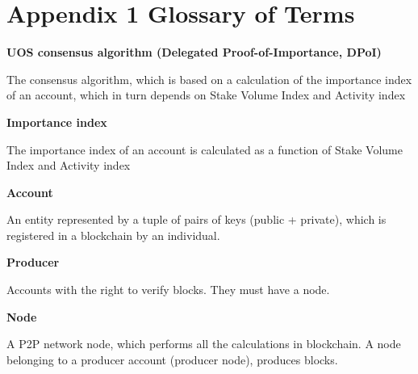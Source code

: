 \documentclass[a4paper,12pt]{article}
\begin{document}
\section {Appendix 1 Glossary of Terms}

\textbf{U{\degree}OS consensus algorithm (Delegated Proof-of-Importance, DPoI)}

The consensus algorithm, which is based on a calculation of the importance index of an account, which in turn depends on Stake Volume Index and Activity index

\textbf{Importance index}

The importance index of an account is calculated as a function of Stake Volume Index and Activity index

\textbf{Account}

An entity represented by a tuple of pairs of keys (public + private), which is registered in a blockchain by an individual.

\textbf{Producer}

Accounts with the right to verify blocks. They must have a node.

\textbf{Node}

A P2P network node, which performs all the calculations in blockchain. A node belonging to a producer account (producer node), produces blocks.

\tableofcontents
\end{document}
